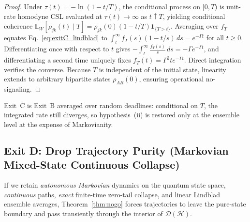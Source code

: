\documentclass[aps,pra,10pt,twocolumn,superscriptaddress,amsmath,amssymb,floatfix]{revtex4-2}
\newcommand{\E}{\mathbb{E}}
\begin{document}
\begin{proof}
Under $\tau(t) = -\ln(1-t/T)$, the conditional process on $[0, T)$ is unit-rate homodyne CSL evaluated at $\tau(t)\to\infty$ as $t\uparrow T$, yielding conditional coherence $\E_W[\rho_{jk}(t)\mid T] = \rho_{jk}(0)(1-t/T)\mathbf{1}_{\{T>t\}}$. Averaging over $f_T$ equates Eq.~\eqref{eq:exitC_lindblad} to $\int_t^\infty f_T(s)(1 - t/s)\,ds = e^{-\Gamma t}$ for all $t \ge 0$. Differentiating once with respect to $t$ gives $-\int_t^\infty \frac{f_T(s)}{s}\,ds = -\Gamma e^{-\Gamma t}$, and differentiating a second time uniquely fixes $f_T(t) = \Gamma^2 t e^{-\Gamma t}$. Direct integration verifies the converse. Because $T$ is independent of the initial state, linearity extends to arbitrary bipartite states $\rho_{AB}(0)$, ensuring operational no-signaling.
\end{proof}

Exit~C is Exit~B averaged over random deadlines: conditional on $T$, the integrated rate still diverges, so hypothesis~(ii) is restored only at the ensemble level at the expense of Markovianity.

\subsection{Exit D: Drop Trajectory Purity (Markovian Mixed-State Continuous Collapse)}
\label{sec:exitD}

If we retain \emph{autonomous Markovian} dynamics on the quantum state space, \emph{continuous} paths, \emph{exact} finite-time zero-tail collapse, and linear Lindblad ensemble averages, Theorem~\ref{thm:nogo} forces trajectories to leave the pure-state boundary and pass transiently through the interior of $\mathcal{D}(\mathcal{H})$.
\end{document}

